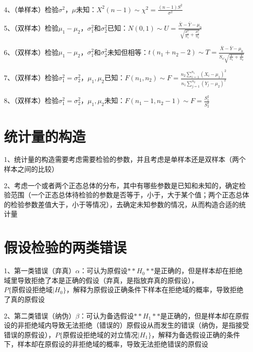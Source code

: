 4、（单样本）检验$ \sigma^{2} $，$ \mu $未知：$ X^2(n-1) \sim \chi^{2}=\frac{(n-1) S^{2}}{\sigma^{2}} $

5、（双样本）检验$ \mu_1-\mu_2 $，$ \sigma_{1}^{2} $和$ \sigma_{2}^{2} $已知：$ N(0,1) \sim U=\frac{\bar{X}-\bar{Y}-\mu_{0}}{\sqrt{\frac{\sigma_{1}^{2}}{n_{1}}+\frac{\sigma_{2}^{2}}{n_{2}}}} $

6、（双样本）检验$ \mu_1-\mu_2 $，$ \sigma_{1}^{2} $和$ \sigma_{2}^{2} $未知但相等：$ t(n_1+n_2-2) \sim T=\frac{\bar{X}-\bar{Y}-\mu_{0}}{S_{\omega} \sqrt{\frac{1}{n_{1}}+\frac{1}{n_{2}}}} $

7、（双样本）检验$ \sigma_{1}^{2} = \sigma_{2}^{2} $，$ \mu_1,\mu_2 $已知：$ F(n_1,n_2) \sim F=\frac{n_{2} \sum_{i=1}^{n_{1}}\left(X_{i}-\mu_{1}\right)^{2}}{n_{1} \sum_{j=1}^{n_{2}}\left(Y_{j}-\mu_{2}\right)^{2}} $

8、（双样本）检验$ \sigma_{1}^{2} = \sigma_{2}^{2} $，$ \mu_1,\mu_2 $未知：$ F(n_1-1,n_2-1) \sim F=\frac{S_{1}^{2}}{S_{2}^{2}} $

\section{统计量的构造}

1、统计量的构造需要考虑需要检验的参数，并且考虑是单样本还是双样本（两个样本之间的比较）

2、考虑一个或者两个正态总体的分布，其中有哪些参数是已知和未知的，确定检验范围（一个正态总体待检验的参数是否等于，小于，大于某个值；两个正态总体的检验参数差值大于，小于等情况），去确定未知参数的情况，从而构造合适的统计量

\section{假设检验的两类错误}

1、第一类错误（弃真）$ \alpha $：可认为原假设$ **H_0** $是正确的，但是样本却在拒绝域里导致拒绝了本是正确的假设（弃真，是指放弃真的原假设），$ P\{ 原假设拒绝域| H_0 \} $，解释为原假设正确条件下样本在拒绝域的概率，导致拒绝了真的原假设

2、第二类错误（纳伪）$ \beta $：可认为备选假设$ **H_1** $是正确的，但是样本却在原假设的非拒绝域内导致无法拒绝（错误的）原假设从而发生的错误（纳伪，是指接受错误的原假设），$ P\{ 原假设拒绝域的对立情况| H_1 \} $，解释为备选假设正确的条件下，样本却在原假设的非拒绝域的概率，导致无法拒绝错误的原假设

